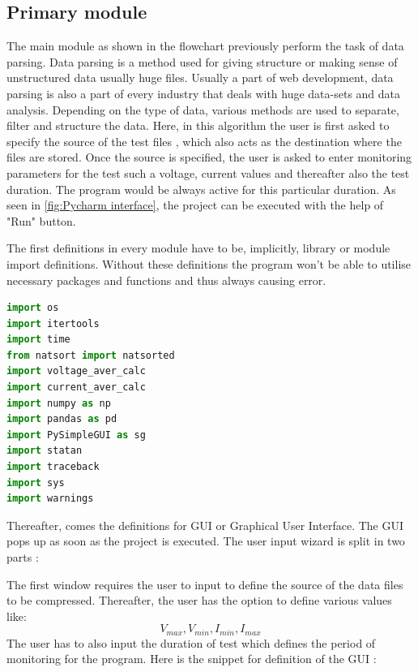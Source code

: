 \clearpage

\subsection{Primary module}

The main module as shown in the flowchart previously perform the task of data parsing. Data parsing is a method used for giving structure or making sense of unstructured data usually huge files. Usually a part of web development, data parsing is also a part of every industry that deals with huge data-sets and data analysis. Depending on the type of data, various methods are used to separate, filter and structure the data. Here, in this algorithm the user is first asked to specify the source of the test files , which also acts as the destination where the files are stored. Once the source is specified, the user is asked to enter monitoring parameters for the test such a voltage, current values and thereafter also the test duration. The program would be always active for this particular duration. As seen in \ref{fig:Pycharm interface}, the project can be executed with the help of "Run" button. 


The first definitions in every module have to be, implicitly, library or module import definitions. Without these definitions the program won't be able to utilise necessary packages and functions and thus always causing error. 

\begin{lstlisting}[label={lst:import},language=Python]
import os
import itertools
import time
from natsort import natsorted
import voltage_aver_calc
import current_aver_calc
import numpy as np
import pandas as pd
import PySimpleGUI as sg
import statan
import traceback
import sys
import warnings
\end{lstlisting}

Thereafter, comes the definitions for GUI or Graphical User Interface. The GUI pops up as soon as the project is executed. The user input wizard is split in two parts : 

The first window requires the user to input to define the source of the data files to be compressed. Thereafter, the user has the option to define various values like: \[V_{max}, V_{min}, I_{min}, I_{max}\] The user has to also input the duration of test which defines the period of monitoring for the program. Here is the snippet for definition of the GUI : 

